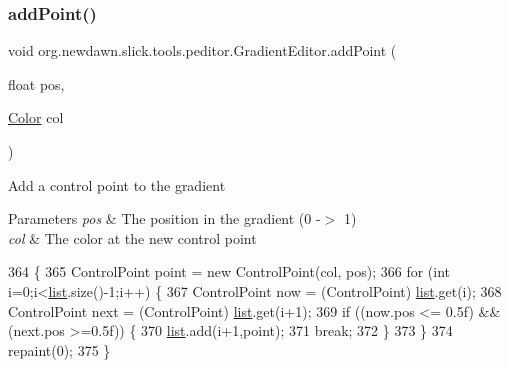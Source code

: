 \subsubsection{\texorpdfstring{add\+Point()}{addPoint()}\hspace{0.1cm}{\footnotesize\ttfamily [2/2]}}
{\footnotesize\ttfamily void org.\+newdawn.\+slick.\+tools.\+peditor.\+Gradient\+Editor.\+add\+Point (\begin{DoxyParamCaption}\item[{float}]{pos,  }\item[{\mbox{\hyperlink{classorg_1_1newdawn_1_1slick_1_1_color}{Color}}}]{col }\end{DoxyParamCaption})\hspace{0.3cm}{\ttfamily [inline]}}

Add a control point to the gradient


\begin{DoxyParams}{Parameters}
{\em pos} & The position in the gradient (0 -\/$>$ 1) \\
\hline
{\em col} & The color at the new control point \\
\hline
\end{DoxyParams}

\begin{DoxyCode}
364                                                \{
365         ControlPoint point = \textcolor{keyword}{new} ControlPoint(col, pos);
366         \textcolor{keywordflow}{for} (\textcolor{keywordtype}{int} i=0;i<\mbox{\hyperlink{classorg_1_1newdawn_1_1slick_1_1tools_1_1peditor_1_1_gradient_editor_aa53704ef8438035eb76c8c6aab8af133}{list}}.size()-1;i++) \{
367             ControlPoint now = (ControlPoint) \mbox{\hyperlink{classorg_1_1newdawn_1_1slick_1_1tools_1_1peditor_1_1_gradient_editor_aa53704ef8438035eb76c8c6aab8af133}{list}}.get(i);
368             ControlPoint next = (ControlPoint) \mbox{\hyperlink{classorg_1_1newdawn_1_1slick_1_1tools_1_1peditor_1_1_gradient_editor_aa53704ef8438035eb76c8c6aab8af133}{list}}.get(i+1);
369             \textcolor{keywordflow}{if} ((now.pos <= 0.5f) && (next.pos >=0.5f)) \{
370                 \mbox{\hyperlink{classorg_1_1newdawn_1_1slick_1_1tools_1_1peditor_1_1_gradient_editor_aa53704ef8438035eb76c8c6aab8af133}{list}}.add(i+1,point);
371                 \textcolor{keywordflow}{break};
372             \}
373         \}
374         repaint(0);
375     \}
\end{DoxyCode}
\mbox{\label{classorg_1_1newdawn_1_1slick_1_1tools_1_1peditor_1_1_gradient_editor_a5a178638b3d41be830a8f74c03ba83f2}} 
